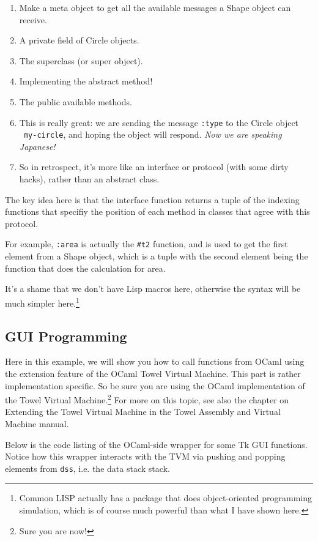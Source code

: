 \documentclass{report}
\newcommand{\mtilde}[1]{\textasciitilde}
\begin{document}
\begin{enumerate}
\item Make a meta object to get all the available messages a Shape object can receive.
\item A private field of Circle objects.
\item The superclass (or super object).
\item Implementing the abstract method!
\item The public available methods.
\item This is really great: we are sending the message \texttt{:type} to the Circle object \texttt{\mtilde ~my-circle}, and hoping the object will respond. \textit{Now we are speaking Japanese!}
\item So in retrospect, it's more like an interface or protocol (with some dirty hacks), rather than an abstract class.
\end{enumerate}

The key idea here is that the interface function returns a tuple of the indexing functions that specifiy the position of each method in classes that agree with this protocol.

For example, \texttt{:area} is actually the \texttt{\#t2} function, and is used to get the first element from a Shape object, which is a tuple with the second element being the function that does the calculation for area.

It's a shame that we don't have Lisp macros here, otherwise the syntax will be much simpler here.\footnote{Common LISP actually has a package that does object-oriented programming simulation, which is of course much powerful than what I have shown here.}

\subsection{GUI Programming}

Here in this example, we will show you how to call functions from OCaml using the extension feature of the OCaml Towel Virtual Machine. This part is rather implementation specific. So be sure you are using the OCaml implementation of the Towel Virtual Machine.\footnote{Sure you are now!} For more on this topic, see also the chapter on Extending the Towel Virtual Machine in the Towel Assembly and Virtual Machine manual.

Below is the code listing of the OCaml-side wrapper for some Tk GUI functions. Notice how this wrapper interacts with the TVM via pushing and popping elements from \texttt{dss}, i.e. the data stack stack.
\end{document}
